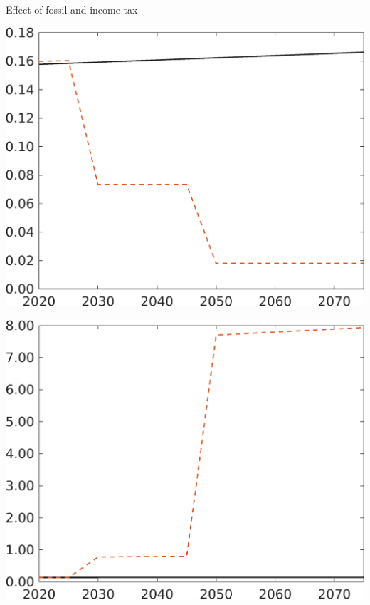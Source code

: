 \documentclass[11pt,aspectratio=169]{beamer}
\begin{document}
\begin{frame}{Effect of fossil and income tax}
\begin{minipage}[]{0.3\textwidth}
	\end{minipage}
	\begin{minipage}[]{0.3\textwidth}
		\includegraphics[width=1\textwidth]{../codding_model/own_basedOnFried/optimalPol_elastS_DisuSci/figures/all_1705/CompCounterFac_withLF_noopt_taufopt1_taulopt0_F_spillover0_noskill0_sep1_BN0_ineq0_red0_xgrowth0_etaa0.79_lgd0.png}
	\end{minipage}
	\begin{minipage}[]{0.3\textwidth}
		\includegraphics[width=1\textwidth]{../codding_model/own_basedOnFried/optimalPol_elastS_DisuSci/figures/all_1705/CompCounterFac_withLF_noopt_taufopt1_taulopt0_GFF_spillover0_noskill0_sep1_BN0_ineq0_red0_xgrowth0_etaa0.79_lgd0.png}

\end{minipage}
\end{frame}
\end{document}
